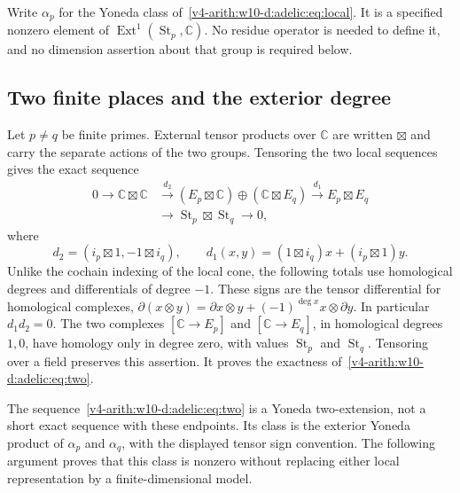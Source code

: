 Write $\alpha_p$ for the Yoneda class of~\eqref{v4-arith:w10-d:adelic:eq:local}. It is a
specified nonzero element of $\operatorname{Ext}^1(\operatorname{St}_p,\mathbb C)$. No residue operator is
needed to define it, and no dimension assertion about that group is
required below.

\subsection{Two finite places and the exterior degree}

Let $p\ne q$ be finite primes. External tensor products over $\mathbb C$ are
written $\boxtimes$ and carry the separate actions of the two groups.
Tensoring the two local sequences gives the exact sequence
\begin{equation}\label{v4-arith:w10-d:adelic:eq:two}
\begin{split}
 0\longrightarrow\mathbb C\boxtimes\mathbb C
 &\xrightarrow{d_2}
 (E_p\boxtimes\mathbb C)\oplus(\mathbb C\boxtimes E_q)
 \xrightarrow{d_1}E_p\boxtimes E_q\\
 &\longrightarrow\operatorname{St}_p\boxtimes\operatorname{St}_q\longrightarrow0,
\end{split}
\end{equation}
where
\[
 d_2=(i_p\boxtimes1,-1\boxtimes i_q),\qquad
 d_1(x,y)=(1\boxtimes i_q)x+(i_p\boxtimes1)y.
\]
Unlike the cochain indexing of the local cone, the following totals use homological degrees and differentials of degree $-1$. These signs are the tensor differential for homological complexes,
$\partial(x\otimes y)=\partial x\otimes y+(-1)^{\deg x}x\otimes\partial y$.
In particular $d_1d_2=0$. The two complexes
$[\mathbb C\to E_p]$ and $[\mathbb C\to E_q]$, in homological degrees $1,0$,
have homology only in degree zero, with values $\operatorname{St}_p$ and $\operatorname{St}_q$.
Tensoring over a field preserves this assertion. It proves the exactness
of~\eqref{v4-arith:w10-d:adelic:eq:two}.

The sequence~\eqref{v4-arith:w10-d:adelic:eq:two} is a Yoneda two-extension, not a short exact
sequence with these endpoints. Its class is the exterior Yoneda product
of $\alpha_p$ and $\alpha_q$, with the displayed tensor sign convention.
The following argument proves that this class is nonzero without
replacing either local representation by a finite-dimensional model.

